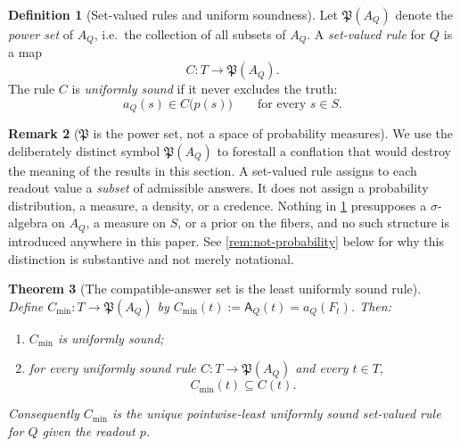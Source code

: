 \documentclass[11pt,reqno]{amsart}
\theoremstyle{plain}
\newtheorem{theorem}{Theorem}[section]
\theoremstyle{definition}
\newtheorem{definition}[theorem]{Definition}
\newtheorem{remark}[theorem]{Remark}
\newcommand{\Src}{S}
\newcommand{\Rdt}{T}
\newcommand{\Pow}{\mathfrak{P}}          %
\newcommand{\CompatSet}{\mathsf{A}}      %
\begin{document}
\begin{definition}[Set-valued rules and uniform soundness]\label{def:sound}
Let $\Pow(A_Q)$ denote the \emph{power set} of $A_Q$, i.e.\ the collection of all subsets of
$A_Q$. A \emph{set-valued rule} for $Q$ is a map
\begin{equation}\label{eq:rule}
C\colon\Rdt\longrightarrow\Pow(A_Q).
\end{equation}
The rule $C$ is \emph{uniformly sound} if it never excludes the truth:
\begin{equation}\label{eq:soundness}
a_Q(s)\in C\bigl(p(s)\bigr)\qquad\text{for every } s\in\Src .
\end{equation}
\end{definition}

\begin{remark}[$\Pow$ is the power set, not a space of probability measures]\label{rem:powerset}
We use the deliberately distinct symbol $\Pow(A_Q)$ to forestall a conflation that would destroy
the meaning of the results in this section. A set-valued rule assigns to each readout value a
\emph{subset} of admissible answers. It does not assign a probability distribution, a measure, a
density, or a credence. Nothing in \cref{def:sound} presupposes a $\sigma$-algebra on $A_Q$, a
measure on $\Src$, or a prior on the fibers, and no such structure is introduced anywhere in this
paper. See \cref{rem:not-probability} below for why this distinction is substantive and not
merely notational.
\end{remark}

\begin{theorem}[The compatible-answer set is the least uniformly sound
rule]\label{thm:minimal-sound}
Define $C_{\min}\colon\Rdt\to\Pow(A_Q)$ by $C_{\min}(t):=\CompatSet_Q(t)=a_Q(F_t)$. Then:
\begin{enumerate}
\item\label{it:cmin-sound} $C_{\min}$ is uniformly sound;
\item\label{it:cmin-least} for every uniformly sound rule $C\colon\Rdt\to\Pow(A_Q)$ and every
$t\in\Rdt$,
\begin{equation}\label{eq:cmin-least}
C_{\min}(t)\subseteq C(t).
\end{equation}
\end{enumerate}
Consequently $C_{\min}$ is the unique pointwise-least uniformly sound set-valued rule for $Q$
given the readout $p$.
\end{theorem}
\end{document}
